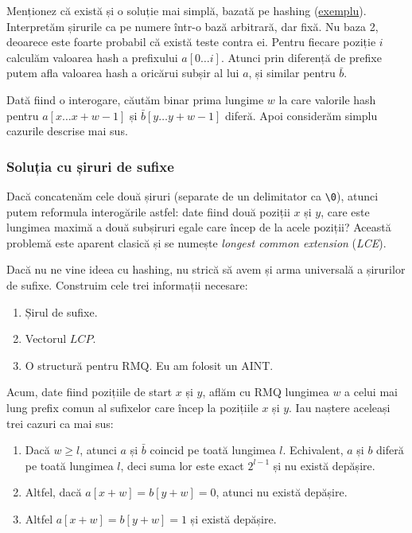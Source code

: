 \documentclass[../main.tex]{subfiles}
\begin{document}
Menționez că există și o soluție mai simplă, bazată pe hashing (\href{https://kilonova.ro/submissions/176125}{exemplu}). Interpretăm șirurile ca pe numere într-o bază arbitrară, dar fixă. Nu baza 2, deoarece este foarte probabil că există teste contra ei. Pentru fiecare poziție $i$ calculăm valoarea hash a prefixului $a[0 \dots i]$. Atunci prin diferență de prefixe putem afla valoarea hash a oricărui subșir al lui $a$, și similar pentru $\bar{b}$.

Dată fiind o interogare, căutăm binar prima lungime $w$ la care valorile hash pentru $a[x \dots x + w - 1]$ și $\bar{b}[y \dots y + w - 1]$ diferă. Apoi considerăm simplu cazurile descrise mai sus.

\subsubsection*{Soluția cu șiruri de sufixe}

Dacă concatenăm cele două șiruri (separate de un delimitator ca \texttt{\textbackslash0}), atunci putem reformula interogările astfel: date fiind două poziții $x$ și $y$, care este lungimea maximă a două subșiruri egale care încep de la acele poziții? Această problemă este aparent clasică și se numește \textit{longest common extension} (\textit{LCE}).

Dacă nu ne vine ideea cu hashing, nu strică să avem și arma universală a șirurilor de sufixe. Construim cele trei informații necesare:

\begin{enumerate}
  \item Șirul de sufixe.
  \item Vectorul $LCP$.
  \item O structură pentru RMQ. Eu am folosit un AINT.
\end{enumerate}

Acum, date fiind pozițiile de start $x$ și $y$, aflăm cu RMQ lungimea $w$ a celui mai lung prefix comun al sufixelor care încep la pozițiile $x$ și $y$. Iau naștere aceleași trei cazuri ca mai sus:

\begin{enumerate}
  \item Dacă $w \geq l$, atunci $a$ și $\bar{b}$ coincid pe toată lungimea $l$. Echivalent, $a$ și $b$ diferă pe toată lungimea $l$, deci suma lor este exact $2^{l-1}$ și nu există depășire.

  \item Altfel, dacă $a[x + w] = b[y + w] = 0$, atunci nu există depășire.

  \item Altfel $a[x + w] = b[y + w] = 1$ și există depășire.
\end{enumerate}
\end{document}
